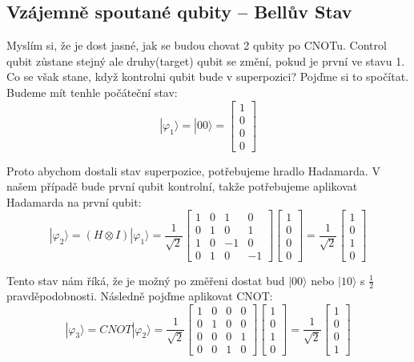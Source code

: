 \documentclass[11pt]{article}
\begin{document}
\subsection{Vzájemně spoutané qubity – Bellův Stav}
Myslím si, že je dost jasné, jak se budou chovat 2 qubity po CNOTu.
Control qubit zůstane stejný ale druhy(target) qubit se změní, pokud je první ve stavu 1.
Co se však stane, když kontrolni qubit bude v superpozici? Pojďme si to spočítat.
Budeme mít tenhle počáteční stav:
$$|\varphi_1 \rangle = |00\rangle = \begin{bmatrix}
        1 \\
        0 \\
        0 \\
        0
    \end{bmatrix}$$
\par Proto abychom dostali stav superpozice, potřebujeme hradlo Hadamarda.
V našem případě bude první qubit kontrolní, takže potřebujeme aplikovat Hadamarda na první qubit:
$$|\varphi_2 \rangle = (H \otimes I) |\varphi_1 \rangle = \frac{1}{\sqrt{2}} \begin{bmatrix}
        1 & 0 & 1  & 0  \\
        0 & 1 & 0  & 1  \\
        1 & 0 & -1 & 0  \\
        0 & 1 & 0  & -1
    \end{bmatrix}\begin{bmatrix}
        1 \\
        0 \\
        0 \\
        0
    \end{bmatrix} = \frac{1}{\sqrt{2}}\begin{bmatrix}
        1 \\
        0 \\
        1 \\
        0
    \end{bmatrix}$$
\par Tento stav nám říká, že je možný po změřeni dostat bud $|00\rangle$ nebo $|10\rangle$ s $\frac{1}{2}$ pravděpodobnosti.
Následně pojďme aplikovat CNOT:
$$|\varphi_3 \rangle = CNOT |\varphi_2 \rangle = \frac{1}{\sqrt{2}} \begin{bmatrix}
        1 & 0 & 0 & 0 \\
        0 & 1 & 0 & 0 \\
        0 & 0 & 0 & 1 \\
        0 & 0 & 1 & 0
    \end{bmatrix}\begin{bmatrix}
        1 \\
        0 \\
        1 \\
        0
    \end{bmatrix} = \frac{1}{\sqrt{2}}\begin{bmatrix}
        1 \\
        0 \\
        0 \\
        1
    \end{bmatrix}$$
\end{document}
